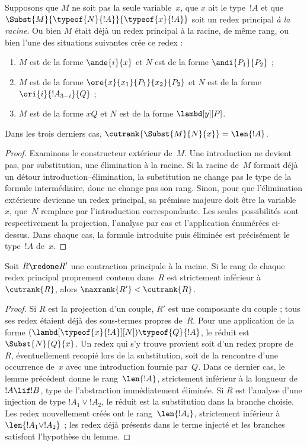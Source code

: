 \documentclass[../../../include/open-logic-section]{subfiles}
\begin{document}
\begin{lem}
  Supposons que $M$ ne soit pas la seule variable~$x$,
  que $x$ ait le type~$!A$ et que
  $\Subst{M}{\typeof{N}{!A}}{\typeof{x}{!A}}$
  soit un redex principal \emph{à la racine}.
  Ou bien $M$ était déjà un redex principal à la racine,
  de même rang, ou bien l'une des situations suivantes
  crée ce redex :
  \begin{enumerate}
  \item $M$ est de la forme $\ande{i}{x}$ et $N$
    est de la forme $\andi{P_1}{P_2}$ ;
  \item $M$ est de la forme
    $\ore{x}{x_1}{P_1}{x_2}{P_2}$ et $N$
    est de la forme $\ori{i}{!A_{3-i}}{Q}$ ;
  \item $M$ est de la forme $x Q$ et $N$
    est de la forme $\lambd[y][P]$.
  \end{enumerate}
  Dans les trois derniers cas,
  $\cutrank{\Subst{M}{N}{x}}=\len{!A}$.
\end{lem}
\begin{proof}
  Examinons le constructeur extérieur de~$M$.
  Une introduction ne devient pas, par substitution,
  une élimination à la racine. Si la racine de~$M$
  formait déjà un détour introduction--élimination,
  la substitution ne change pas le type de la formule
  intermédiaire, donc ne change pas son rang.
  Sinon, pour que l'élimination extérieure devienne
  un redex principal, sa prémisse majeure doit être
  la variable~$x$, que~$N$ remplace par l'introduction
  correspondante. Les seules possibilités sont
  respectivement la projection, l'analyse par cas
  et l'application énumérées ci-dessus. Dans chaque cas,
  la formule introduite puis éliminée est précisément
  le type~$!A$ de~$x$.
\end{proof}

\begin{lem}
  Soit $R \redone R'$ une contraction principale à la
  racine. Si le rang de chaque redex principal proprement
  contenu dans~$R$ est strictement inférieur à
  $\cutrank{R}$, alors
  $\maxrank{R'}<\cutrank{R}$.
\end{lem}
\begin{proof}
  Si $R$ est la projection d'un couple, $R'$ est une
  composante du couple ; tous ses redex étaient déjà
  des sous-termes propres de~$R$.
  Pour une application de la forme
  $(\lambd[\typeof{x}{!A}][N])\typeof{Q}{!A}$,
  le réduit est $\Subst{N}{Q}{x}$.
  Un redex qui s'y trouve provient soit d'un redex
  propre de~$R$, éventuellement recopié lors de la
  substitution, soit de la rencontre d'une occurrence
  de~$x$ avec une introduction fournie par~$Q$.
  Dans ce dernier cas, le lemme précédent donne le
  rang~$\len{!A}$, strictement inférieur à la longueur
  de~$!A\lif !B$, type de l'abstraction
  immédiatement éliminée.
  Si $R$ est l'analyse d'une injection de type
  $!A_1\lor !A_2$, le réduit est la substitution dans
  la branche choisie. Les redex nouvellement créés
  ont le rang~$\len{!A_i}$, strictement inférieur à
  $\len{!A_1\lor !A_2}$ ; les redex déjà présents dans
  le terme injecté et les branches satisfont
  l'hypothèse du lemme.
\end{proof}
\end{document}
